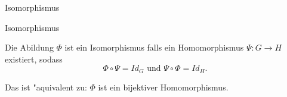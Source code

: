 \documentclass[class=article, crop=false]{standalone}
\begin{document}
\begin{zettel}{Isomorphismus}
\begin{flashcard}[5zftnnqx]{Isomorphismus}
	\begin{definition}[Isomorphismus]
		Die Abildung $\Phi$ ist ein Isomorphismus falls ein Homomorphismus $\Psi: G \longrightarrow H$ existiert, sodass
		\[
			\Phi \circ \Psi = Id_G \text{ und } \Psi \circ \Phi =  Id_H
		.\]

		Das ist "aquivalent zu: $\Phi$ ist ein bijektiver Homomorphismus.
	\end{definition}
\end{flashcard}
\end{zettel}
\end{document}

